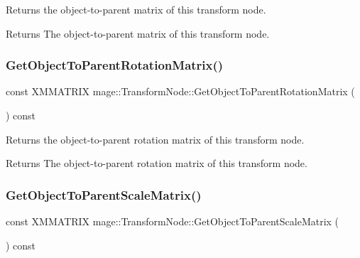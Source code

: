 Returns the object-\/to-\/parent matrix of this transform node.

\begin{DoxyReturn}{Returns}
The object-\/to-\/parent matrix of this transform node. 
\end{DoxyReturn}
\hypertarget{classmage_1_1_transform_node_ae72c1a89c45d21458e897522b0ae6842}{}\label{classmage_1_1_transform_node_ae72c1a89c45d21458e897522b0ae6842} 
\subsubsection{\texorpdfstring{Get\+Object\+To\+Parent\+Rotation\+Matrix()}{GetObjectToParentRotationMatrix()}}
{\footnotesize\ttfamily const X\+M\+M\+A\+T\+R\+IX mage\+::\+Transform\+Node\+::\+Get\+Object\+To\+Parent\+Rotation\+Matrix (\begin{DoxyParamCaption}{ }\end{DoxyParamCaption}) const}

Returns the object-\/to-\/parent rotation matrix of this transform node.

\begin{DoxyReturn}{Returns}
The object-\/to-\/parent rotation matrix of this transform node. 
\end{DoxyReturn}
\hypertarget{classmage_1_1_transform_node_a36cbdebf999dc41871446f12c129041d}{}\label{classmage_1_1_transform_node_a36cbdebf999dc41871446f12c129041d} 
\subsubsection{\texorpdfstring{Get\+Object\+To\+Parent\+Scale\+Matrix()}{GetObjectToParentScaleMatrix()}}
{\footnotesize\ttfamily const X\+M\+M\+A\+T\+R\+IX mage\+::\+Transform\+Node\+::\+Get\+Object\+To\+Parent\+Scale\+Matrix (\begin{DoxyParamCaption}{ }\end{DoxyParamCaption}) const}

